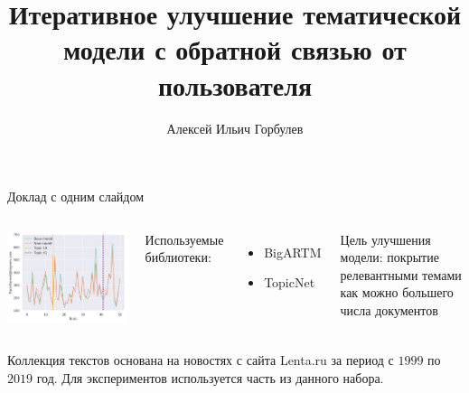 \documentclass{beamer}
\title[\hbox to 56mm{Итеративное улучшение}]{Итеративное улучшение тематической \\ модели с обратной связью от пользователя}
\author[А.\,И. Горбулев]{Алексей Ильич Горбулев}
\institute{Московский физико-технический институт}
\date{\footnotesize
\par\smallskip\emph{Курс:} Моя первая научная статья/Группа Б05-021а
\par\smallskip\emph{Эксперт:} д. ф.-м. н. К.\,В.~Воронцов
\par\smallskip\emph{Консультант:} В.\,А.~Алексеев
\par\bigskip\small 2023}
\begin{document}
\begin{frame}
\thispagestyle{empty}
\maketitle
\end{frame}
\begin{frame}{Доклад с одним слайдом}

\begin{columns}[c]
\includegraphics[width=1.0\textwidth]{figures/topickernel_bigram_size.png}
    
    Используемые библиотеки:
    \begin{itemize}
        \item BigARTM
        \item TopicNet
    \end{itemize}
    {\footnotesize Цель улучшения модели: покрытие релевантными темами как можно большего числа документов}
\end{columns}

\bigskip
{\footnotesize Коллекция текстов основана на новостях с сайта Lenta.ru за период с $1999$ по $2019$ год. Для экспериментов используется часть из данного набора.}
\end{frame}


\end{document}
